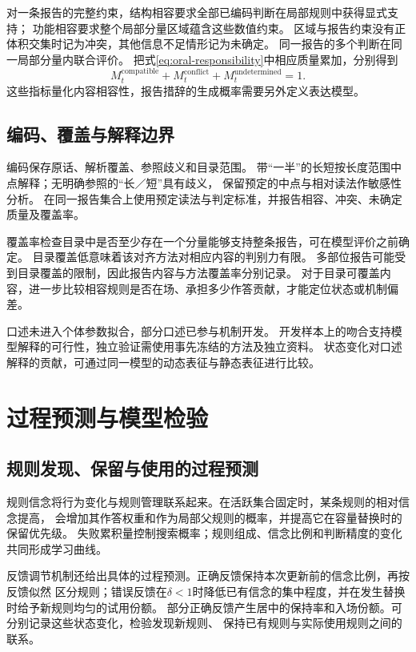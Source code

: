 \documentclass[11pt,a4paper]{article}
\numberwithin{equation}{section}
\begin{document}
对一条报告的完整约束，结构相容要求全部已编码判断在局部规则中获得显式支持；
功能相容要求整个局部分量区域蕴含这些数值约束。
区域与报告约束没有正体积交集时记为冲突，其他信息不足情形记为未确定。
同一报告的多个判断在同一局部分量内联合评价。
把式\eqref{eq:oral-responsibility}中相应质量累加，分别得到
\begin{equation}
M_t^{\mathrm{compatible}}+M_t^{\mathrm{conflict}}+M_t^{\mathrm{undetermined}}=1.
\end{equation}
这些指标量化内容相容性，报告措辞的生成概率需要另外定义表达模型。

\subsection{编码、覆盖与解释边界}
编码保存原话、解析覆盖、参照歧义和目录范围。
带“一半”的长短按长度范围中点解释；无明确参照的“长／短”具有歧义，
保留预定的中点与相对读法作敏感性分析。
在同一报告集合上使用预定读法与判定标准，并报告相容、冲突、未确定质量及覆盖率。

覆盖率检查目录中是否至少存在一个分量能够支持整条报告，可在模型评价之前确定。
目录覆盖低意味着该对齐方法对相应内容的判别力有限。
多部位报告可能受到目录覆盖的限制，因此报告内容与方法覆盖率分别记录。
对于目录可覆盖内容，进一步比较相容规则是否在场、承担多少作答贡献，才能定位状态或机制偏差。

口述未进入个体参数拟合，部分口述已参与机制开发。
开发样本上的吻合支持模型解释的可行性，独立验证需使用事先冻结的方法及独立资料。
状态变化对口述解释的贡献，可通过同一模型的动态表征与静态表征进行比较。

\section{过程预测与模型检验}
\label{sec:validation}

\subsection{规则发现、保留与使用的过程预测}

规则信念将行为变化与规则管理联系起来。在活跃集合固定时，某条规则的相对信念提高，
会增加其作答权重和作为局部父规则的概率，并提高它在容量替换时的保留优先级。
失败累积量控制搜索概率；规则组成、信念比例和判断精度的变化共同形成学习曲线。

反馈调节机制还给出具体的过程预测。正确反馈保持本次更新前的信念比例，再按反馈似然
区分规则；错误反馈在$\delta<1$时降低已有信念的集中程度，并在发生替换时给予新规则均匀的试用份额。
部分正确反馈产生居中的保持率和入场份额。可分别记录这些状态变化，检验发现新规则、
保持已有规则与实际使用规则之间的联系。
\end{document}
